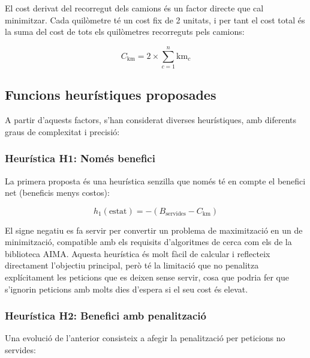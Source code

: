 El cost derivat del recorregut dels camions és un factor directe que cal minimitzar. Cada quilòmetre té un cost fix de 2 unitats, i per tant el cost total és la suma del cost de tots els quilòmetres recorreguts pels camions:

\begin{equation}
C_{\text{km}} = 2 \times \sum_{c=1}^{n} \text{km}_c
\end{equation}

\vspace{0.5cm}

\subsection{Funcions heurístiques proposades}

A partir d’aquests factors, s’han considerat diverses heurístiques, amb diferents graus de complexitat i precisió:

\vspace{0.5cm}

\subsubsection{Heurística H1: Només benefici}

La primera proposta és una heurística senzilla que només té en compte el benefici net (beneficis menys costos):

\begin{equation}
h_1(\text{estat}) = -(B_{\text{servides}} - C_{\text{km}})
\end{equation}

El signe negatiu es fa servir per convertir un problema de maximització en un de minimització, compatible amb els requisits d’algoritmes de cerca com els de la biblioteca AIMA. Aquesta heurística és molt fàcil de calcular i reflecteix directament l’objectiu principal, però té la limitació que no penalitza explícitament les peticions que es deixen sense servir, cosa que podria fer que s’ignorin peticions amb molts dies d’espera si el seu cost és elevat.

\vspace{0.5cm}

\subsubsection{Heurística H2: Benefici amb penalització}

Una evolució de l’anterior consisteix a afegir la penalització per peticions no servides:

